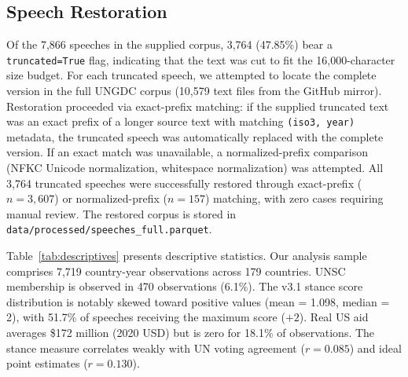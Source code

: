 \subsection{Speech Restoration}

Of the 7,866 speeches in the supplied corpus, 3,764 (47.85\%) bear a \texttt{truncated=True} flag, indicating that the text was cut to fit the 16,000-character size budget. For each truncated speech, we attempted to locate the complete version in the full UNGDC corpus (10,579 text files from the GitHub mirror). Restoration proceeded via exact-prefix matching: if the supplied truncated text was an exact prefix of a longer source text with matching \texttt{(iso3, year)} metadata, the truncated speech was automatically replaced with the complete version. If an exact match was unavailable, a normalized-prefix comparison (NFKC Unicode normalization, whitespace normalization) was attempted. All 3,764 truncated speeches were successfully restored through exact-prefix ($n=3{,}607$) or normalized-prefix ($n=157$) matching, with zero cases requiring manual review. The restored corpus is stored in \texttt{data/processed/speeches\_full.parquet}.



Table~\ref{tab:descriptives} presents descriptive statistics. Our analysis sample comprises 7,719 country-year observations across 179 countries. UNSC membership is observed in 470 observations (6.1\%). The v3.1 stance score distribution is notably skewed toward positive values (mean = 1.098, median = 2), with 51.7\% of speeches receiving the maximum score ($+2$). Real US aid averages \$172 million (2020 USD) but is zero for 18.1\% of observations. The stance measure correlates weakly with UN voting agreement ($r=0.085$) and ideal point estimates ($r=0.130$).
